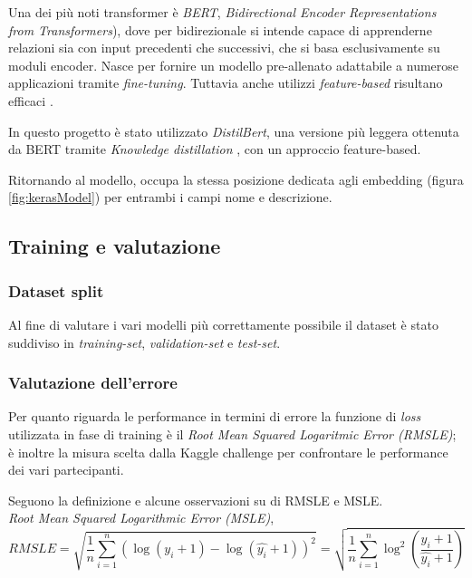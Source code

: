 

Una dei più noti transformer è \textit{BERT}, \textit{Bidirectional Encoder
Representations from Transformers}), dove per bidirezionale si intende capace di
apprenderne relazioni sia con input precedenti che successivi, che si basa
esclusivamente su moduli encoder. Nasce per fornire un modello pre-allenato
adattabile a numerose applicazioni tramite \textit{fine-tuning}.
Tuttavia anche utilizzi \textit{feature-based} risultano efficaci
\cite{devlin2018bert}.

In questo progetto è stato utilizzato \textit{DistilBert}, una versione più leggera ottenuta
da BERT tramite \textit{Knowledge distillation} \cite{sanh2020distilbert}, con un approccio feature-based.

Ritornando al modello, occupa la stessa posizione dedicata agli embedding
(figura \ref{fig:kerasModel}) per entrambi i campi nome e descrizione.

\subsection{Training e valutazione}

\subsubsection{Dataset split}

Al fine di valutare i vari modelli più correttamente possibile il dataset è
stato suddiviso in \textit{training-set}, \textit{validation-set} e
\textit{test-set}.

\subsubsection{Valutazione dell'errore}

Per quanto riguarda le performance in termini di errore la funzione di
\textit{loss} utilizzata in fase di training è il \textit{Root Mean Squared
	Logaritmic Error (RMSLE)}; è inoltre la misura scelta dalla Kaggle challenge
per confrontare le performance dei vari partecipanti.

Seguono la definizione e alcune osservazioni su di RMSLE e MSLE.
\\
\textit{Root Mean Squared Logarithmic Error (MSLE)},
\begin{equation}
	RMSLE
	=
	\sqrt{
	\frac{1}{n}
	\sum_{i=1}^{n}
	( \log(y_i+1) - \log(\hat{y_i}+1) )^2
	}
	=
	\sqrt{
		\frac{1}{n}
		\sum_{i=1}^{n}
		\log^2(\frac{y_i+1}{\hat{y_i}+1})
	}
\end{equation}

